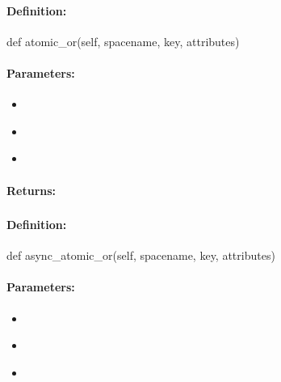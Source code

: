 \paragraph{Definition:}
\begin{pythoncode}
def atomic_or(self, spacename, key, attributes)
\end{pythoncode}

\paragraph{Parameters:}
\begin{itemize}[noitemsep]
\item {}\\

\item {}\\

\item {}\\

\end{itemize}

\paragraph{Returns:}


\pagebreak
\subsubsection{}
\label{api:python:async_atomic_or}


\paragraph{Definition:}
\begin{pythoncode}
def async_atomic_or(self, spacename, key, attributes)
\end{pythoncode}

\paragraph{Parameters:}
\begin{itemize}[noitemsep]
\item {}\\

\item {}\\

\item {}\\

\end{itemize}

